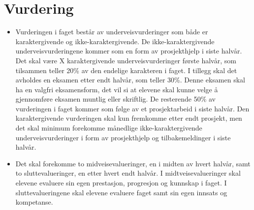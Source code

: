 \section*{Vurdering} \label{Sec: Vurdering}

    \begin{itemize}

        \item Vurderingen i faget består av underveisvurderinger som både er karaktergivende og ikke-karaktergivende. De ikke-karaktergivende underveisvurderingene kommer som en form av prosjekthjelp i siste halvår. Det skal være X karaktergivende underveisvurderinger første halvår, som tilsammen teller 20\% av den endelige karakteren i faget. I tillegg skal det avholdes en eksamen etter endt halvår, som teller 30\%. Denne eksamen skal ha en valgfri eksamensform, det vil si at elevene skal kunne velge å gjennomføre eksamen muntlig eller skriftlig. De resterende 50\% av vurderingen i faget kommer som følge av et prosjektarbeid i siste halvår. Den karaktergivende vurderingen skal kun fremkomme etter endt prosjekt, men det skal minimum forekomme månedlige ikke-karaktergivende underveisvurderinger i form av prosjekthjelp og tilbakemeldinger i siste halvår.

        \item Det skal forekomme to midveisevalueringer, en i midten av hvert halvår, samt to sluttevalueringer, en etter hvert endt halvår. I midtveisevalueringer skal elevene evaluere sin egen prestasjon, progresjon og kunnskap i faget. I sluttevalueringene skal elevene evaluere faget samt sin egen innsats og kompetanse.

    \end{itemize}
